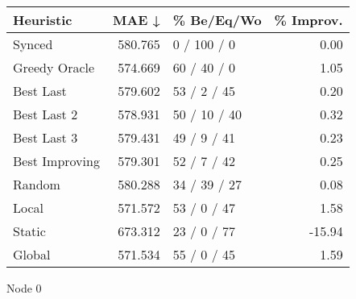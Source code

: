 \begin{tabular}{lrlr}
\toprule
\textbf{Heuristic} & \textbf{MAE ↓} & \textbf{\% Be/Eq/Wo} & \textbf{\% Improv.} \\
\midrule
            Synced &        580.765 &          0 / 100 / 0 &                0.00 \\
     Greedy Oracle &        574.669 &          60 / 40 / 0 &                1.05 \\
         Best Last &        579.602 &          53 / 2 / 45 &                0.20 \\
       Best Last 2 &        578.931 &         50 / 10 / 40 &                0.32 \\
       Best Last 3 &        579.431 &          49 / 9 / 41 &                0.23 \\
    Best Improving &        579.301 &          52 / 7 / 42 &                0.25 \\
            Random &        580.288 &         34 / 39 / 27 &                0.08 \\
             Local &        571.572 &          53 / 0 / 47 &                1.58 \\
            Static &        673.312 &          23 / 0 / 77 &              -15.94 \\
            Global &        571.534 &          55 / 0 / 45 &                1.59 \\
\bottomrule
\end{tabular}
\caption{Node 0}
\label{tab:iid_lr05_le1_bs2_0}
